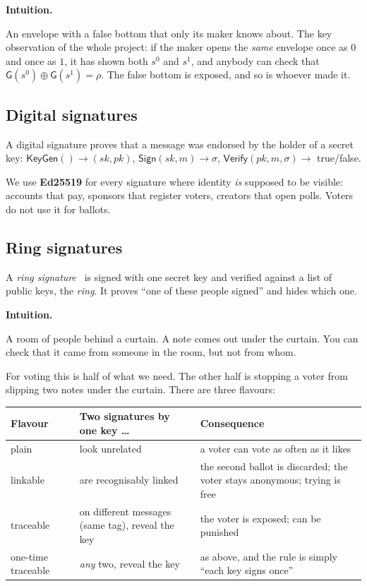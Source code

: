\documentclass[11pt,a4paper]{article}
\newcommand{\sk}{\mathit{sk}}
\newcommand{\pk}{\mathit{pk}}
\newcommand{\Gf}{\mathsf{G}}
\newcommand{\Sign}{\textsf{Sign}}
\newcommand{\Verify}{\textsf{Verify}}
\newcommand{\KeyGen}{\textsf{KeyGen}}
\newenvironment{intuition}[1][Intuition]{%
  \def\FrameCommand{\fboxsep=8pt\fcolorbox{boxrule}{boxbg}}%
  \MakeFramed{\advance\hsize-2\fboxsep\FrameRestore}%
  \noindent\textbf{#1.}\par\smallskip%
  \itshape
}{\endMakeFramed}
\theoremstyle{definition}
\begin{document}
\begin{intuition}
An envelope with a false bottom that only its maker knows about. The key
observation of the whole project: if the maker opens the \emph{same}
envelope once as $0$ and once as $1$, it has shown both $s^0$ and $s^1$,
and anybody can check that $\Gf(s^0) \oplus \Gf(s^1) = \rho$. The false
bottom is exposed, and so is whoever made it.
\end{intuition}

\subsection{Digital signatures}

A digital signature proves that a message was endorsed by the holder of a
secret key: $\KeyGen() \to (\sk, \pk)$, $\Sign(\sk, m) \to \sigma$,
$\Verify(\pk, m, \sigma) \to$ true/false.

We use \textbf{Ed25519} for every signature where identity \emph{is}
supposed to be visible: accounts that pay, sponsors that register voters,
creators that open polls. Voters do not use it for ballots.

\subsection{Ring signatures}
\label{sec:ringsigs}

A \emph{ring signature}~\cite{RST01} is signed with one secret key and
verified against a list of public keys, the \emph{ring}. It proves ``one of
these people signed'' and hides which one.

\begin{intuition}
A room of people behind a curtain. A note comes out under the curtain. You
can check that it came from someone in the room, but not from whom.
\end{intuition}

\noindent
For voting this is half of what we need. The other half is stopping a
voter from slipping two notes under the curtain. There are three
flavours:

\begin{center}
\small
\begin{tabularx}{\textwidth}{l X X}
\toprule
Flavour & Two signatures by one key \ldots & Consequence \\
\midrule
plain & look unrelated & a voter can vote as often as it likes \\
linkable~\cite{LWW04} & are recognisably linked & the second ballot is discarded; the voter stays anonymous; trying is free \\
traceable~\cite{FS07} & on different messages (same tag), reveal the key & the voter is exposed; can be punished \\
one-time traceable~\cite{SZ21} & \emph{any} two, reveal the key & as above, and the rule is simply ``each key signs once'' \\
\bottomrule
\end{tabularx}
\end{center}
\end{document}
